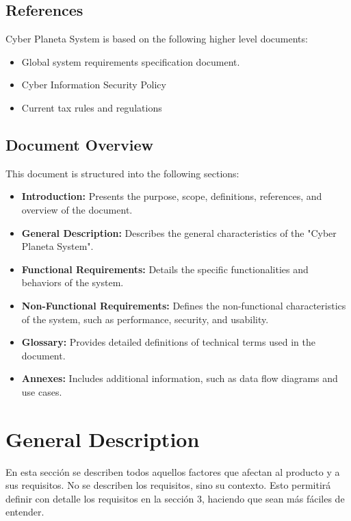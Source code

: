 \documentclass[12pt,a4paper, twosite]{article}
\begin{document}
\subsection{References}
\label{sec:org62711e0}

Cyber Planeta System is based on the following higher level documents:
\begin{itemize}
    \item Global system requirements specification document.
    \item Cyber Information Security Policy
    \item Current tax rules and regulations
\end{itemize}


\subsection{Document Overview}
\label{sec:orgdaca22c}
This document is structured into the following sections:

\begin{itemize}
  \item \textbf{Introduction:} Presents the purpose, scope, definitions, references, and overview of the document.
  \item \textbf{General Description:} Describes the general characteristics of the "Cyber Planeta System".
  \item \textbf{Functional Requirements:} Details the specific functionalities and behaviors of the system.
  \item \textbf{Non-Functional Requirements:} Defines the non-functional characteristics of the system, such as performance, security, and usability.
  \item \textbf{Glossary:} Provides detailed definitions of technical terms used in the document.
  \item \textbf{Annexes:} Includes additional information, such as data flow diagrams and use cases.
\end{itemize}


\section{General Description}
\label{sec:orgc1c4017}

En esta sección se describen todos aquellos factores que afectan al
producto y a sus requisitos. No se describen los requisitos, sino su
contexto. Esto permitirá definir con detalle los requisitos en la
sección 3, haciendo que sean más fáciles de entender.
\end{document}
